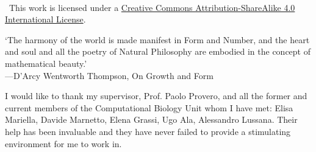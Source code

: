 \documentclass[a4paper,oneside,marginals=justified,nobib]{tufte-book}
\newcommand{\monthyear}{\ifcase\month\or January\or February\or March\or 
April\or May\or June\or July\or August\or September\or October\or 
November\or December\fi\space\number\year} %
\begin{document}

\newpage
~\vfill
\thispagestyle{empty}
\setlength{\parindent}{0pt}
\setlength{\parskip}{\baselineskip}

\ccbysa\ This work is licensed under a 
\href{http://creativecommons.org/licenses/by-sa/4.0/}
{Creative Commons Attribution-ShareAlike 4.0 International License}.



\tableofcontents %
\listoffigures %
\listoftables %
\listoftodos


\cleardoublepage
\null{}
\begin{doublespace}
\noindent\fontsize{15}{15}\selectfont\itshape
\nohyphenation

`The harmony of the world is made manifest in Form and Number, and the 
heart and soul and all the poetry of Natural Philosophy are embodied in 
the concept of mathematical beauty.'\\
---D'Arcy Wentworth Thompson, \textnormal{On Growth and Form}


\noindent\fontsize{15}{15}\selectfont\itshape

I would like to thank my supervisor, Prof. Paolo Provero, and all the 
former and current members of the Computational Biology Unit whom I have 
met: Elisa Mariella, Davide Marnetto, Elena Grassi, Ugo Ala, Alessandro 
Lussana. Their help has been invaluable and they have never failed to 
provide a stimulating environment for me to work in.

\end{doublespace}
\null
\end{document}
